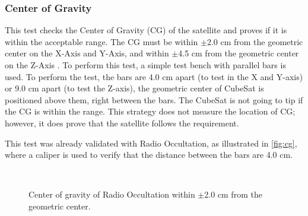 \subsubsection{Center of Gravity}

This test checks the Center of Gravity (CG) of the satellite and proves if it is within the acceptable range. The CG must be within $\pm$2.0 cm from the geometric center on the X-Axis and Y-Axis, and within $\pm$4.5 cm from the geometric center on the Z-Axis \cite{cds}. To perform this test, a simple test bench with parallel bars is used. To perform the test, the bars are 4.0 cm apart (to test in the X and Y-axis) or 9.0 cm apart (to test the Z-axis), the geometric center of CubeSat is positioned above them, right between the bars. The CubeSat is not going to tip if the CG is within the range. This strategy does not measure the location of CG; however, it does prove that the satellite follows the requirement.

This test was already validated with Radio Occultation, as illustrated in \autoref{fig:cg}, where a caliper is used to verify that the distance between the bars are 4.0 cm.

\begin{figure}[!htb]
    \begin{center}
        ~
        ~
        \caption{Center of gravity of Radio Occultation within $\pm$2.0 cm from the geometric center.}
        \label{fig:cg}
    \end{center}
\end{figure}

